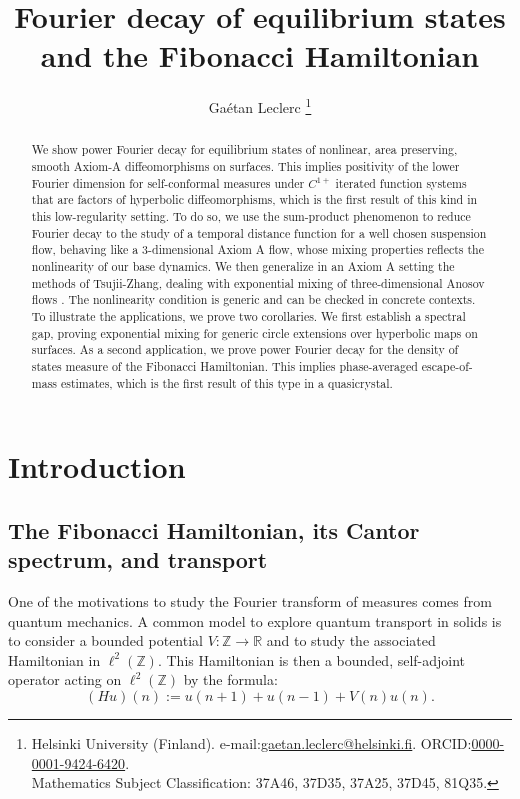 \documentclass[a4paper]{article}
\title{\textbf{Fourier decay of equilibrium states and the Fibonacci Hamiltonian}}
\author{Gaétan Leclerc \footnote{Helsinki University (Finland). e-mail:\href{mailto:gaetan.leclerc@helsinki.fi}{gaetan.leclerc@helsinki.fi}. ORCID:\href{https://orcid.org/0000-0001-9424-6420}{0000-0001-9424-6420}. \\ Mathematics Subject Classification: 37A46, 37D35, 37A25, 37D45, 81Q35. } }
\date{}
\theoremstyle{definition}
\begin{document}
\maketitle


\begin{abstract}
We show power Fourier decay for equilibrium states of nonlinear, area preserving, smooth Axiom-A diffeomorphisms on surfaces. This implies positivity of the lower Fourier dimension for self-conformal measures under $C^{1+}$ iterated function systems that are factors of hyperbolic diffeomorphisms, which is the first result of this kind in this low-regularity setting. To do so, we use the sum-product phenomenon to reduce Fourier decay to the study of a temporal distance function for a well chosen suspension flow, behaving like a 3-dimensional Axiom A flow, whose mixing properties reflects the nonlinearity of our base dynamics. We then generalize in an Axiom A setting the methods of Tsujii-Zhang, dealing with exponential mixing of three-dimensional Anosov flows \cite{TZ20}. The nonlinearity condition is generic and can be checked in concrete contexts. To illustrate the applications, we prove two corollaries. We first establish a spectral gap, proving exponential mixing for generic circle extensions over hyperbolic maps on surfaces. As a second application, we prove power Fourier decay for the density of states measure of the Fibonacci Hamiltonian. This implies phase-averaged escape-of-mass estimates, which is the first result of this type in a quasicrystal.
\end{abstract}


\tableofcontents


\section{Introduction}\label{sec:Intro}

\subsection{The Fibonacci Hamiltonian, its Cantor spectrum, and transport}

One of the motivations to study the Fourier transform of measures comes from quantum mechanics. A common model to explore quantum transport in solids is to consider a bounded potential $V:\mathbb{Z} \rightarrow \mathbb{R}$ and to study the associated Hamiltonian in $\ell^2(\mathbb{Z})$. This Hamiltonian is then a bounded, self-adjoint operator acting on $\ell^2(\mathbb{Z})$ by the formula:
$$ (H u)(n) := u(n+1) + u(n-1) + V(n) u(n). $$
\end{document}
